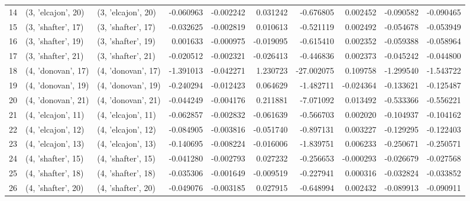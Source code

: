 \begin{tabular}{lllrrrrrrr}
14 &  (3, 'elcajon', 20) &  (3, 'elcajon', 20) & -0.060963 & -0.002242 &  0.031242 &  -0.676805 &  0.002452 & -0.090582 & -0.090465 \\
15 &  (3, 'shafter', 17) &  (3, 'shafter', 17) & -0.032625 & -0.002819 &  0.010613 &  -0.521119 &  0.002492 & -0.054678 & -0.053949 \\
16 &  (3, 'shafter', 19) &  (3, 'shafter', 19) &  0.001633 & -0.000975 & -0.019095 &  -0.615410 &  0.002352 & -0.059388 & -0.058964 \\
17 &  (3, 'shafter', 21) &  (3, 'shafter', 21) & -0.020512 & -0.002321 & -0.026413 &  -0.446836 &  0.002373 & -0.045242 & -0.044800 \\
18 &  (4, 'donovan', 17) &  (4, 'donovan', 17) & -1.391013 & -0.042271 &  1.230723 & -27.002075 &  0.109758 & -1.299540 & -1.543722 \\
19 &  (4, 'donovan', 19) &  (4, 'donovan', 19) & -0.240294 & -0.012423 &  0.064629 &  -1.482711 & -0.024364 & -0.133621 & -0.125487 \\
20 &  (4, 'donovan', 21) &  (4, 'donovan', 21) & -0.044249 & -0.004176 &  0.211881 &  -7.071092 &  0.013492 & -0.533366 & -0.556221 \\
21 &  (4, 'elcajon', 11) &  (4, 'elcajon', 11) & -0.062857 & -0.002832 & -0.061639 &  -0.566703 &  0.002020 & -0.104937 & -0.104162 \\
22 &  (4, 'elcajon', 12) &  (4, 'elcajon', 12) & -0.084905 & -0.003816 & -0.051740 &  -0.897131 &  0.003227 & -0.129295 & -0.122403 \\
23 &  (4, 'elcajon', 13) &  (4, 'elcajon', 13) & -0.140695 & -0.008224 & -0.016006 &  -1.839751 &  0.006233 & -0.250671 & -0.250571 \\
24 &  (4, 'shafter', 15) &  (4, 'shafter', 15) & -0.041280 & -0.002793 &  0.027232 &  -0.256653 & -0.000293 & -0.026679 & -0.027568 \\
25 &  (4, 'shafter', 18) &  (4, 'shafter', 18) & -0.035306 & -0.001649 & -0.009519 &  -0.227941 &  0.000316 & -0.032824 & -0.033852 \\
26 &  (4, 'shafter', 20) &  (4, 'shafter', 20) & -0.049076 & -0.003185 &  0.027915 &  -0.648994 &  0.002432 & -0.089913 & -0.090911 \\
\bottomrule
\end{tabular}
